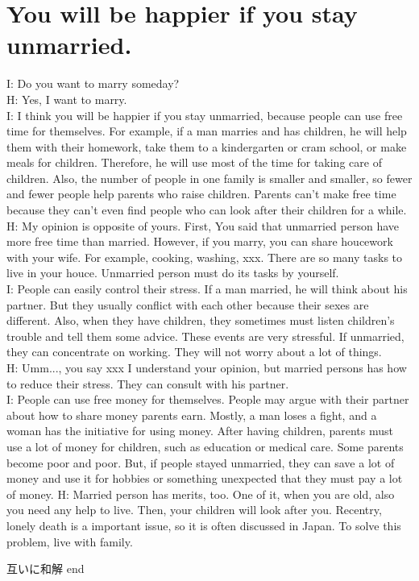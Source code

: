 \documentclass[11pt]{jsarticle}
\begin{document}
\section{You will be happier if you stay unmarried.}
\noindent
I: Do you want to marry someday?\\
H: Yes, I want to marry.\\
I: I think you will be happier if you stay unmarried, because people can use free time for themselves.
For example, if a man marries and has children, he will help them with their homework,
take them to a kindergarten or cram school, or make meals for children.
Therefore, he will use most of the time for taking care of children.
Also, the number of people in one family is smaller and smaller, so fewer and fewer people help parents who raise children.
Parents can’t make free time because they can’t even find people who can look after their children for a while. \\
%
H: My opinion is opposite of yours.
First, You said that unmarried person have more free time than married.
However, if you marry, you can share houcework with your wife.
For example, cooking, washing, xxx. 
There are so many tasks to live in your houce. Unmarried person must do its tasks by yourself.\\
%
I: People can easily control their stress. 
If a man married, he will think about his partner. 
But they usually conflict with each other because their sexes are different.
Also, when they have children, they sometimes must listen children’s trouble and tell them some advice.
These events are very stressful. If unmarried, they can concentrate on working. They will not worry about a lot of things.\\
H: Umm..., you say xxx
I understand your opinion, but married persons has how to reduce their stress.
They can consult with his partner.\\
I: People can use free money for themselves. 
People may argue with their partner about how to share money parents earn.
Mostly, a man loses a fight, and a woman has the initiative for using money.
After having children, parents must use a lot of money for children, such as education or medical care.
Some parents become poor and poor.
But, if people stayed unmarried,
they can save a lot of money and use it for hobbies or something unexpected that they must pay a lot of money. 
H: Married person has merits, too. One of it, when you are old, also you need any help to live.
Then, your children will look after you.
Recentry, lonely death is a important issue, so it is often discussed in Japan.
To solve this problem, live with family. 

互いに和解
end
\end{document}
